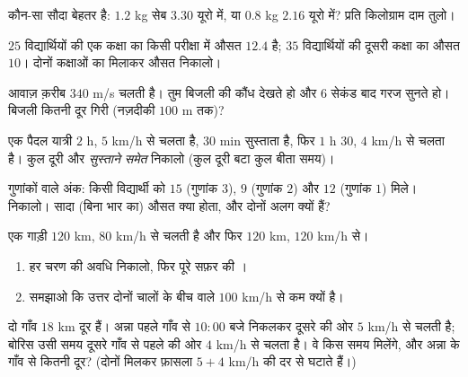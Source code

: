 \begin{exercise}[$\star$]\label{exo:g8:speed:5}
कौन-सा सौदा बेहतर है: $1.2$ kg सेब $3.30$ यूरो में, या $0.8$ kg
$2.16$ यूरो में? प्रति किलोग्राम दाम तुलो।
\end{exercise}

\begin{exercise}[$\star$]\label{exo:g8:speed:6}
$25$ विद्यार्थियों की एक कक्षा का किसी परीक्षा में औसत $12.4$ है;
$35$ विद्यार्थियों की दूसरी कक्षा का औसत $10$। दोनों कक्षाओं का
मिलाकर औसत निकालो।
\end{exercise}

\begin{exercise}[$\star$]\label{exo:g8:speed:7}
आवाज़ क़रीब $340$ m/s चलती है। तुम बिजली की कौंध देखते हो और $6$
सेकंड बाद गरज सुनते हो। बिजली कितनी दूर गिरी (नज़दीकी $100$ m तक)?
\end{exercise}

\begin{exercise}[$\star\star$]\label{exo:g8:speed:8}
एक पैदल यात्री $2$ h, $5$ km/h से चलता है, $30$ min सुस्ताता है,
फिर $1$ h $30$, $4$ km/h से चलता है। कुल दूरी और \emph{सुस्ताने
समेत}  निकालो (कुल दूरी बटा कुल बीता समय)।
\end{exercise}

\begin{exercise}[$\star\star$]\label{exo:g8:speed:9}
गुणांकों वाले अंक: किसी विद्यार्थी को $15$ (गुणांक $3$), $9$
(गुणांक $2$) और $12$ (गुणांक $1$) मिले।  निकालो। सादा
(बिना भार का) औसत क्या होता, और दोनों अलग क्यों हैं?
\end{exercise}

\begin{exercise}[$\star\star$]\label{exo:g8:speed:10}
एक गाड़ी $120$ km, $80$ km/h से चलती है और फिर $120$ km, $120$ km/h से।
\begin{enumerate}
  \item हर चरण की अवधि निकालो, फिर पूरे सफ़र की ।
  \item समझाओ कि उत्तर दोनों चालों के बीच वाले $100$ km/h से कम
        क्यों है।
\end{enumerate}
\end{exercise}

\begin{exercise}[$\star\star\star$]\label{exo:g8:speed:11}
दो गाँव $18$ km दूर हैं। अन्ना पहले गाँव से $10{:}00$ बजे निकलकर
दूसरे की ओर $5$ km/h से चलती है; बोरिस उसी समय दूसरे गाँव से पहले की
ओर $4$ km/h से चलता है। वे किस समय मिलेंगे, और अन्ना के गाँव से
कितनी दूर? (दोनों मिलकर फ़ासला $5 + 4$ km/h की दर से घटाते हैं।)
\end{exercise}

